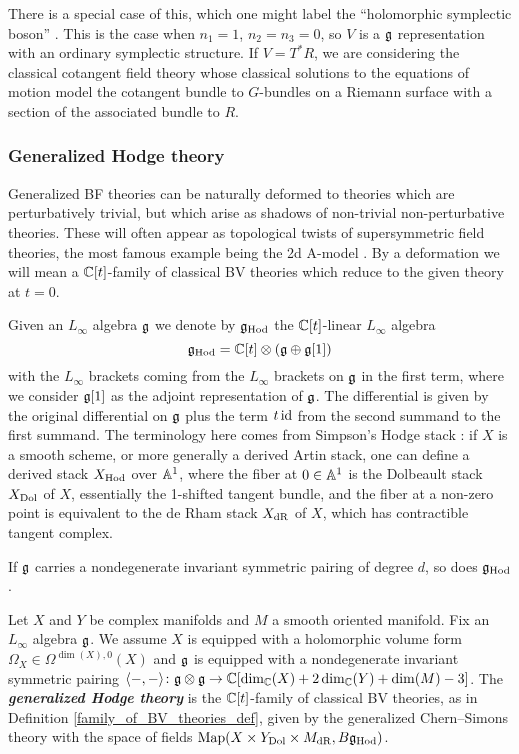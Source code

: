 \documentclass[10pt, oneside]{article}
\newcommand{\Hod}{\mathrm{Hod}}
\newcommand{\defterm}[1]{\textbf{\emph{#1}}}
\begin{document}
\begin{example}
There is a special case of this, which one might label the ``holomorphic symplectic boson'' \cite[Definition 4.8]{SWchar}.  This is the case when $n_1 = 1$, $n_2 = n_3 = 0$, so $V$ is a $\mathfrak g$ representation with an ordinary symplectic structure.  If $V = T^*R$, we are considering the classical cotangent field theory whose classical solutions to the equations of motion model the cotangent bundle to $G$-bundles on a Riemann surface with a section of the associated bundle to $R$.
\end{example}

\subsubsection{Generalized Hodge theory}
Generalized BF theories can be naturally deformed to theories which are perturbatively trivial, but which arise as shadows of non-trivial non-perturbative theories.  These will often appear as topological twists of supersymmetric field theories, the most famous example being the 2d A-model . By a deformation we will mean a $\mathbb C[t]$-family of classical BV theories which reduce to the given theory at $t=0$.

Given an $L_\infty$ algebra $\mathfrak g$ we denote by $\fg_{\Hod}$ the $\mathbb C[t]$-linear $L_\infty$ algebra
\[\fg_{\Hod} = \CC[t]\otimes (\fg\oplus \fg[1])\]
with the $L_\infty$ brackets coming from the $L_\infty$ brackets on $\mathfrak g$ in the first term, where we consider $\mathfrak g[1]$ as the adjoint representation of $\mathfrak g$. The differential is given by the original differential on $\mathfrak g$ plus the term $t\operatorname{id}$ from the second summand to the first summand.  The terminology here comes from Simpson's Hodge stack \cite{Simpson}: if $X$ is a smooth scheme, or more generally a derived Artin stack, one can define a derived stack $X_{\mathrm{Hod}}$ over $\mathbb{A}^1$, where the fiber at $0 \in \mathbb{A}^1$ is the Dolbeault stack $X_{\mathrm{Dol}}$ of $X$, essentially the 1-shifted tangent bundle, and the fiber at a non-zero point is equivalent to the de Rham stack $X_{\mathrm{dR}}$ of $X$, which has contractible tangent complex.

If $\mathfrak g$ carries a nondegenerate invariant symmetric pairing of degree $d$, so does $\fg_{\Hod}$.

\begin{definition} \label{Hodge_family_def}
Let $X$ and $Y$ be complex manifolds and $M$ a smooth oriented manifold. Fix an $L_\infty$ algebra $\mathfrak g$. We assume $X$ is equipped with a holomorphic volume form $\Omega_X \in\Omega^{\dim(X), 0}(X)$ and $\mathfrak g$ is equipped with a nondegenerate invariant symmetric pairing $\langle-, -\rangle\colon \mathfrak g\otimes\mathfrak g\rightarrow \mathbb C[\dim_\mathbb C(X) + 2\dim_\mathbb C(Y) + \dim(M) - 3]$. The \defterm{generalized Hodge theory} is the $\mathbb C[t]$-family of classical BV theories, as in Definition \ref{family_of_BV_theories_def}, given by the generalized Chern--Simons theory with the space of fields $\map(X\times Y_{\mr{Dol}}\times M_{\mr{dR}}, B \fg_\Hod)$.
\end{definition}
\end{document}
